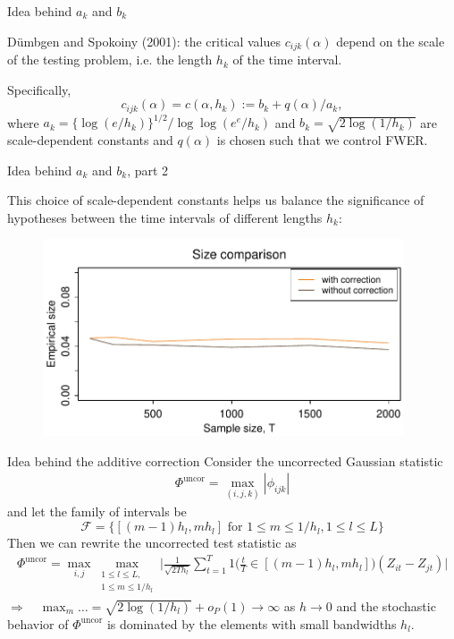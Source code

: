 \documentclass[10pt]{beamer}
\begin{document}
\begin{frame}[label = frame_scaleconstants]{Idea behind $a_k$ and $b_k$}

D{\"u}mbgen and Spokoiny (2001): the critical values $c_{ijk}(\alpha)$ depend on the scale of the testing problem, i.e. the length $h_k$ of the time interval.\pause 

Specifically, 
\[c_{ijk}(\alpha) = c(\alpha,h_k) := b_k + q(\alpha)/a_k,\] where $a_k = \{\log(e/h_k)\}^{1/2} / \log \log(e^e / h_k)$ and $b_k = \sqrt{2 \log(1/h_k)}$ are scale-dependent constants and $q(\alpha)$ is chosen such that we control FWER.
\end{frame}

\begin{frame}{Idea behind $a_k$ and $b_k$, part 2}

This choice of scale-dependent constants helps us balance the significance of hypotheses between the time intervals of different lengths $h_k$:

\begin{figure}
    		\centering
	\includegraphics[width=0.95\textwidth]{plots/size_with_correction}
\end{figure}


\hyperlink{frame_critval<4>}{}
\end{frame}



\begin{frame}{Idea behind the additive correction}
Consider the uncorrected Gaussian statistic
\begin{align*}
\Phi^{\text{uncor}} = \max_{(i,j,k)} |\phi_{ijk}|
\end{align*}\pause
and let the family of intervals be \[\mathcal{F} = \big\{[(m-1) h_l, m h_l] \text{ for } 1\le m \le 1/h_l, 1 \le l \le L\big\}\]\pause
Then we can rewrite the uncorrected test statistic as
\begin{align*}
\Phi^{\text{uncor}} = \max_{i, j} \max_{\substack{1 \le l \le L, \\ 1\le m \le 1/h_l}} \Big|\frac{1}{\sqrt{2 T h_l}} \sum\limits_{t=1}^T 1 \Big( \frac{t}{T} \in [(m-1) h_l, m h_l] \Big) (Z_{it} - Z_{jt})\Big|
\end{align*}\pause
$\Rightarrow \quad \max_m \ldots =\sqrt{2\log(1/h_l)} + o_P(1) \to \infty$ as $h \to 0$ and the stochastic behavior of $\Phi^{\text{uncor}}$ is dominated by the elements with small bandwidths $h_l$. \hyperlink{frame_test<4>}{}
\end{frame}
\end{document}

